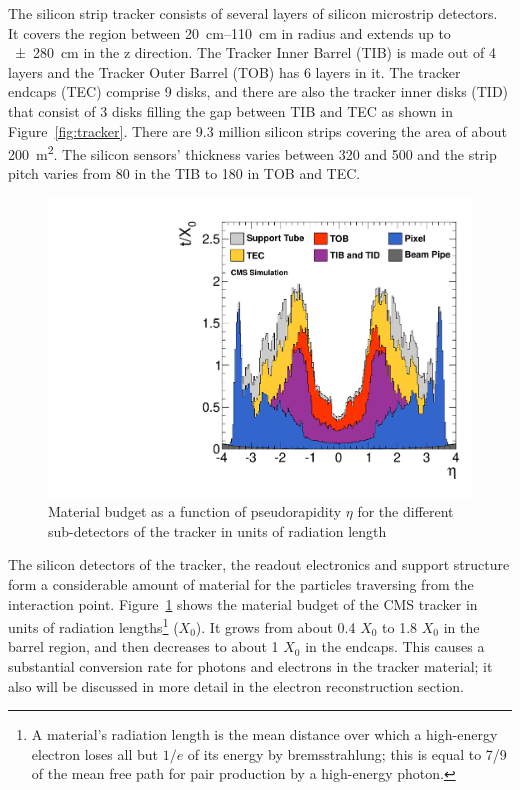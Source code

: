 The silicon strip tracker consists of several layers of silicon microstrip detectors. It covers the region between
\SIrange{20}{110}{\cm} in radius and extends up to \SI{+-280}{\cm} in the z direction. The Tracker Inner Barrel (TIB) is
made out of 4 layers and the Tracker Outer Barrel (TOB) has 6 layers in it. The tracker endcaps (TEC) comprise 9 disks,
and there are also the tracker inner disks (TID) that consist of 3 disks filling the gap between TIB and TEC as shown in
Figure~\ref{fig:tracker}. There are \num{9.3} million silicon strips covering the area of about \SI{200}{\m\squared}.
The silicon sensors' thickness varies between \num{320} and \SI{500}{\micron} and the strip pitch varies from
\SI{80}{\micron} in the TIB to \SI{180}{\micron} in TOB and TEC.

\begin{figure}[!htbp]
  \centering
  \leavevmode
  \includegraphics[width=0.6\columnwidth]{tracker_material_budget}
  \caption{Material budget as a function of pseudorapidity $\eta$ for the different sub-detectors of the tracker in
  units of radiation length \autocite{CMS_tracker_twiki}}
  \label{fig:tracker_material_budget}
\end{figure}

The silicon detectors of the tracker, the readout electronics and support structure form a considerable amount of
material for the particles traversing from the interaction point. Figure~\ref{fig:tracker_material_budget}
\autocite{CMS} shows the material budget of the CMS tracker in units of radiation lengths\footnote{A material's
radiation length is the mean distance over which a high-energy electron loses all but $1/e$ of its energy by
bremsstrahlung; this is equal to \num{7/9} of the mean free path for pair production by a high-energy photon.} ($X_0$).
It grows from about \num{0.4} $X_0$ to \num{1.8} $X_0$ in the barrel region, and then decreases to about \num{1} $X_0$
in the endcaps. This causes a substantial conversion rate for photons and electrons in the tracker material; it also
will be discussed in more detail in the electron reconstruction section.

